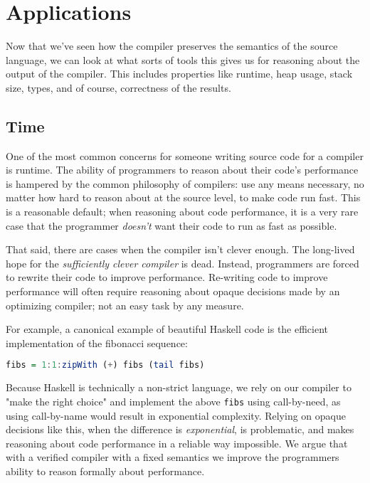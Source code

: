\section{Applications}

Now that we've seen how the compiler preserves the semantics of the source
language, we can look at what sorts of tools this gives us for reasoning about
the output of the compiler. This includes properties like runtime, heap usage,
stack size, types, and of course, correctness of the results.

\subsection{Time}

One of the most common concerns for someone writing source code for a compiler
is runtime. The ability of programmers to reason about their code's performance
is hampered by the common philosophy of compilers: use any means necessary, no
matter how hard to reason about at the source level, to make code run fast. This
is a reasonable default; when reasoning about code performance, it is a very
rare case that the programmer \emph{doesn't} want their code to run as fast as
possible. 

That said, there are cases when the compiler isn't clever enough. The long-lived
hope for the \emph{sufficiently clever compiler} is dead. Instead, programmers
are forced to rewrite their code to improve performance. Re-writing code to
improve performance will often require reasoning about opaque decisions made by
an optimizing compiler; not an easy task by any measure.

For example, a canonical example of beautiful Haskell code is the efficient
implementation of the fibonacci sequence: 

\begin{lstlisting}[language=Haskell]
fibs = 1:1:zipWith (+) fibs (tail fibs)
\end{lstlisting}

Because Haskell is technically a non-strict language, we rely on our compiler to
"make the right choice" and implement the above \texttt{fibs} using
call-by-need, as using call-by-name would result in exponential complexity.
Relying on opaque decisions like this, when the difference is
\emph{exponential}, is problematic, and makes reasoning about code performance
in a reliable way impossible. We argue that with a verified compiler with a
fixed semantics we improve the programmers ability to reason formally about
performance. 

